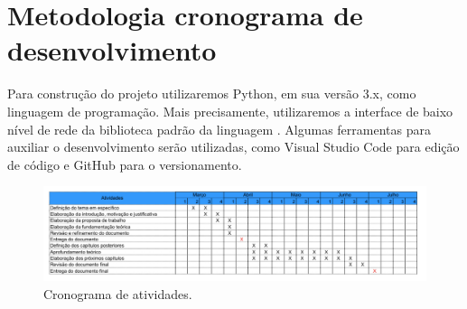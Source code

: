 \chapter{\label{chap:chap4} Metodologia cronograma de desenvolvimento}

Para construção do projeto utilizaremos Python, em sua versão 3.x, como linguagem de programação.
Mais precisamente, utilizaremos a interface de baixo nível de rede da biblioteca padrão da linguagem \cite{socketPython}.
Algumas ferramentas para auxiliar o desenvolvimento serão utilizadas, como Visual Studio Code para edição de código e GitHub para o versionamento.

\begin{figure}[htb!]
    \centering\includegraphics[width=1\textwidth]{fig3.pdf}
    \caption%
    {\label{fig:fig3} Cronograma de atividades.}
\end{figure}



